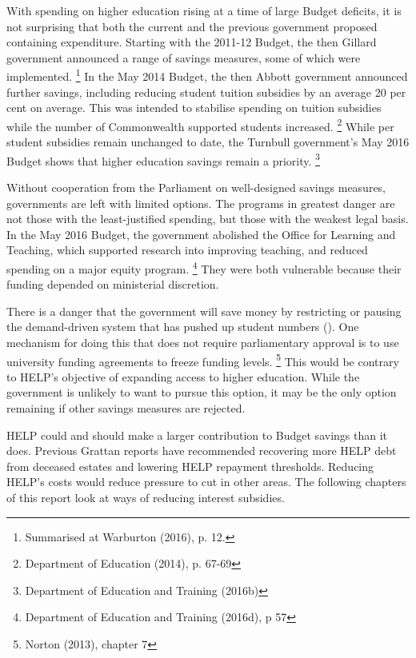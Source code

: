 \documentclass[embargoed]{grattan}
\begin{document}
{With spending on higher education rising at a time of large Budget deficits, it is not surprising that both the current and the previous government proposed containing expenditure.
Starting with the 2011-12 Budget, the then Gillard government announced a range of savings measures, some of which were implemented.%
\footnote{Summarised at Warburton (2016), p. 12.} In the May 2014 Budget, the then Abbott government announced further savings, including reducing student tuition subsidies by an average 20 per cent on average.
This was intended to stabilise spending on tuition subsidies while the number of Commonwealth supported students increased.%
\footnote{Department of Education (2014), p. 67-69} While per student subsidies remain unchanged to date, the Turnbull government's May 2016 Budget shows that higher education savings remain a priority.%
\footnote{Department of Education and Training (2016b)}

Without cooperation from the Parliament on well-designed savings measures, governments are left with limited options.
The programs in greatest danger are not those with the least-justified spending, but those with the weakest legal basis.
In the May 2016 Budget, the government abolished the Office for Learning and Teaching, which supported research into improving teaching, and reduced spending on a major equity program.%
\footnote{Department of Education and Training (2016d), p 57} They were both vulnerable because their funding depended on ministerial discretion.

There is a danger that the government will save money by restricting or pausing the demand-driven system that has pushed up student numbers ().
One mechanism for doing this that does not require parliamentary approval is to use university funding agreements to freeze funding levels.%
\footnote{Norton (2013), chapter 7} This would be contrary to \gls{HELP}'s objective of expanding access to higher education.
While the government is unlikely to want to pursue this option, it may be the only option remaining if other savings measures are rejected.

\gls{HELP} could and should make a larger contribution to Budget savings than it does.
Previous Grattan reports have recommended recovering more \gls{HELP} debt from deceased estates and lowering \gls{HELP} repayment thresholds.
Reducing \gls{HELP}'s costs would reduce pressure to cut in other areas.
The following chapters of this report look at ways of reducing interest subsidies.

}
\end{document}
